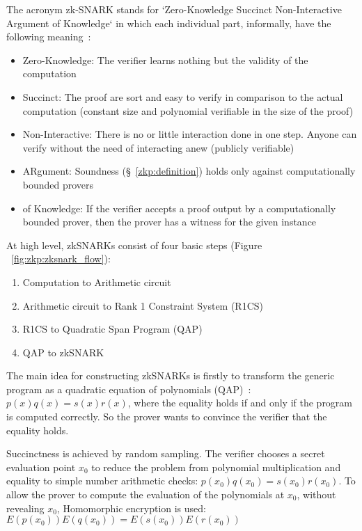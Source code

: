 The acronym zk-SNARK stands for `Zero-Knowledge Succinct Non-Interactive Argument of Knowledge` in which each individual part, informally, have the following meaning~\cite{zksnarks_nutshell, zcash, 184425, Bitansky:2012:ECR:2090236.2090263}:

\begin{itemize}
  \item Zero-Knowledge: The verifier learns nothing but the validity of the computation
  \item Succinct: The proof are sort and easy to verify in comparison to the actual computation (constant size and polynomial verifiable in the size of the proof)
  \item Non-Interactive: There is no or little interaction done in one step. Anyone can verify without the need of interacting anew (publicly verifiable)
  \item ARgument: Soundness (§~\ref{zkp:definition}) holds only against computationally bounded provers
  \item of Knowledge: If the verifier accepts a proof output by a computationally bounded prover, then the prover has a witness for the given instance
\end{itemize}

At high level, zkSNARKs consist of four basic steps (Figure ~\ref{fig:zkp:zksnark_flow}):

\begin{enumerate}
  \item Computation to Arithmetic circuit~\cite{wiki:circuits}
  \item Arithmetic circuit to Rank 1 Constraint System (R1CS)~\cite{ggpr}
  \item R1CS to Quadratic Span Program (QAP)~\cite{ggpr}
  \item QAP to zkSNARK~\cite{pinocchio-nearly-practical-verifiable-computation}
\end{enumerate}

The main idea for constructing zkSNARKs is firstly to transform the generic program as a quadratic equation of polynomials (QAP)~\cite{ggpr}: $p(x)q(x) = s(x)r(x)$, where the equality holds if and only if the program is computed correctly. So the prover wants to convince the verifier that the equality holds.

Succinctness is achieved by random sampling. The verifier chooses a secret evaluation point $x_0$ to reduce the problem from polynomial multiplication and equality to simple number arithmetic checks: $p(x_0)q(x_0) = s(x_0)r(x_0)$. To allow the prover to compute the evaluation of the polynomials at $x_0$, without revealing $x_0$, Homomorphic encryption is used:  $E(p(x_0))E(q(x_0)) = E(s(x_0))E(r(x_0))$

